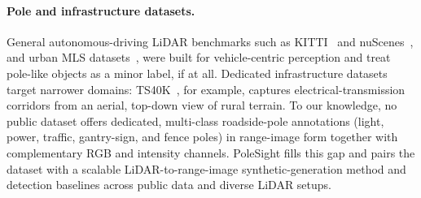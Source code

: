 \paragraph{Pole and infrastructure datasets.}
General autonomous-driving LiDAR benchmarks such as
KITTI~\cite{geiger2012kitti} and nuScenes~\cite{caesar2020nuscenes}, and urban
MLS datasets~\cite{roynard2018parislille, behley2019semantickitti,
tan2020toronto}, were built for vehicle-centric perception and treat
pole-like objects as a minor label, if at all. Dedicated infrastructure
datasets target narrower domains: TS40K~\cite{lavado2025ts40k}, for example,
captures electrical-transmission corridors from an aerial, top-down view of
rural terrain. To our knowledge, no public dataset offers dedicated,
multi-class roadside-pole annotations (light, power, traffic, gantry-sign,
and fence poles) in range-image form together with complementary RGB and
intensity channels. PoleSight fills this gap and pairs the dataset with a
scalable LiDAR-to-range-image synthetic-generation method and detection
baselines across public data and diverse LiDAR setups.


